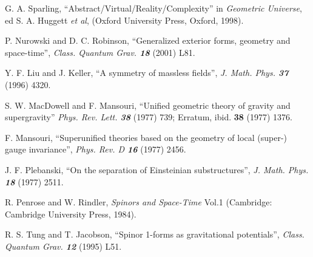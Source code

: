 \documentclass[a4paper,twocolumn,showpacs,prd]{revtex4}
\begin{document}
\begin{thebibliography}{}
G. A. Sparling, ``Abstract/Virtual/Reality/Complexity'' in
        {\it Geometric Universe}, ed S. A. Huggett {\it et al},
        (Oxford University Press, Oxford, 1998).

P. Nurowski and D. C. Robinson, ``Generalized
exterior forms, geometry and space-time'',
        {\it Class. Quantum Grav. \bf 18}  (2001) L81.

 Y. F. Liu and J. Keller, ``A symmetry of massless fields'',
 {\it J. Math. Phys. \bf 37}
  (1996) 4320.

S. W. MacDowell and F. Mansouri, ``Unified geometric theory of
gravity and supergravity''
        {\it Phys. Rev. Lett. \bf 38}  (1977)
        739; Erratum, ibid.
        {\bf 38}  (1977) 1376.

F. Mansouri, ``Superunified theories based on the geometry of
local (super-) gauge invariance'', {\it Phys. Rev. D \bf 16}
(1977) 2456.

J. F. Plebanski, ``On the separation of Einsteinian
substructures'', {\it J. Math. Phys. \bf 18} (1977) 2511.


R. Penrose and W. Rindler, {\it Spinors and Space-Time} Vol.1
(Cambridge: Cambridge University Press, 1984).

R. S. Tung and T. Jacobson, ``Spinor 1-forms as gravitational
potentials'', {\it Class. Quantum Grav. \bf 12}  (1995) L51.


\end{thebibliography}
\end{document}
